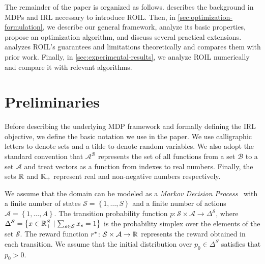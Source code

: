 \documentclass[10pt]{article}
\renewcommand{\cite}{\citep}
\theoremstyle{plain}
\theoremstyle{remark}
\begin{document}
The remainder of the paper is organized as follows.  describes the background in MDPs and IRL necessary to introduce ROIL. Then, in \cref{sec:optimization-formulation}, we describe our general framework, analyze its basic properties, propose an optimization algorithm, and discuss several practical extensions.  analyzes ROIL's guarantees and limitations theoretically and compares them with prior work. Finally, in \cref{sec:experimental-results}, we analyze ROIL numerically and compare it with relevant algorithms. 

\section{Preliminaries}\label{sec:preliminaries}

Before describing the underlying MDP framework and formally defining the IRL objective, we define the basic notation we use in the paper. We use calligraphic letters to denote sets and a tilde to denote random variables. We also adopt the standard convention that $\mathcal{A}^{\mathcal{B}}$ represents the set of all functions from a set $\mathcal{B}$ to a set $\mathcal{A}$ and treat vectors as a function from indexes to real numbers. Finally, the sets $\mathbb{R}$ and $\mathbb{R}_+$ represent real and non-negative numbers respectively. 




We assume that the domain can be modeled as a \emph{Markov Decision Process}~\cite{Puterman1994} with a finite number of states $\mathcal{S} = \left\{ 1, \dots , S \right\}$ and a finite number of actions $\mathcal{A} = \left\{ 1, \dots , A \right\}$. The transition probability function $p\colon \mathcal{S} \times \mathcal{A} \to \Delta^{\mathcal{S}}$, where $\Delta^{\mathcal{S}} = \left\{ x\in \mathbb{R}_{+}^S \mid \sum_{s\in \mathcal{S}} x_s =1 \right\}$ is the probability simplex over the elements of the set $\mathcal{S}$. The reward function $r^{\mathnormal{\star}} \colon \mathcal{S} \times \mathcal{A} \to \mathbb{R}$ represents the reward obtained in each transition. We assume that the initial distribution over $p_0\in \Delta^S$ satisfies that $p_0 > 0$.
\end{document}
